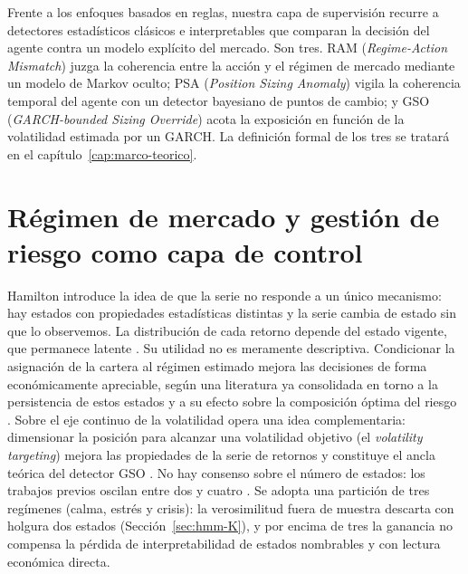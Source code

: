 Frente a los enfoques basados en reglas, nuestra capa de supervisión recurre a detectores estadísticos clásicos e interpretables que comparan la decisión del agente contra un modelo explícito del mercado. Son tres. RAM (\emph{Regime-Action Mismatch}) juzga la coherencia entre la acción y el régimen de mercado mediante un modelo de Markov oculto; PSA (\emph{Position Sizing Anomaly}) vigila la coherencia temporal del agente con un detector bayesiano de puntos de cambio; y GSO (\emph{GARCH-bounded Sizing Override}) acota la exposición en función de la volatilidad estimada por un GARCH. La definición formal de los tres se tratará en el capítulo~\ref{cap:marco-teorico}. 

\section{Régimen de mercado y gestión de riesgo como capa de control}
\label{sec:regimen}

Hamilton introduce la idea de que la serie no responde a un único mecanismo: hay estados con propiedades estadísticas distintas y la serie cambia de estado sin que lo observemos. La distribución de cada retorno depende del estado vigente, que permanece latente \cite{hamilton1989}. Su utilidad no es meramente descriptiva. Condicionar la asignación de la cartera al régimen estimado mejora las decisiones de forma económicamente apreciable, según una literatura ya consolidada en torno a la persistencia de estos estados y a su efecto sobre la composición óptima del riesgo \cite{ang2002regime, guidolin2007regime}. Sobre el eje continuo de la volatilidad opera una idea complementaria: dimensionar la posición para alcanzar una volatilidad objetivo (el \emph{volatility targeting}) mejora las propiedades de la serie de retornos y constituye el ancla teórica del detector GSO \cite{moreira2017}. No hay consenso sobre el número de estados: los trabajos previos oscilan entre dos \cite{ang2002regime} y cuatro \cite{guidolin2007regime}. Se adopta una partición de tres regímenes (calma, estrés y crisis): la verosimilitud fuera de muestra descarta con holgura dos estados (Sección~\ref{sec:hmm-K}), y por encima de tres la ganancia no compensa la pérdida de interpretabilidad de estados nombrables y con lectura económica directa.

